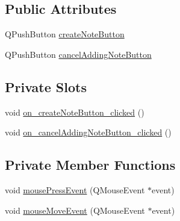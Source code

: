 \subsection*{Public Attributes}
\begin{DoxyCompactItemize}
\item 
Q\+Push\+Button \hyperlink{classaddNoteDialog_ae424f90e2d41fa5ec323d4c93a91f527}{create\+Note\+Button}
\item 
Q\+Push\+Button \hyperlink{classaddNoteDialog_a05ecc54eb7cba0d6ffbc5cabc8a4f551}{cancel\+Adding\+Note\+Button}
\end{DoxyCompactItemize}
\subsection*{Private Slots}
\begin{DoxyCompactItemize}
\item 
void \hyperlink{classaddNoteDialog_a67b28dc05851888a45774eb240d6e43d}{on\+\_\+create\+Note\+Button\+\_\+clicked} ()
\item 
void \hyperlink{classaddNoteDialog_af0e53e8f605b12087a3982e53409ca2f}{on\+\_\+cancel\+Adding\+Note\+Button\+\_\+clicked} ()
\end{DoxyCompactItemize}
\subsection*{Private Member Functions}
\begin{DoxyCompactItemize}
\item 
void \hyperlink{classaddNoteDialog_a5479e71fa86229b5d3a2e03ffd3ddbeb}{mouse\+Press\+Event} (Q\+Mouse\+Event $\ast$event)
\item 
void \hyperlink{classaddNoteDialog_a56670c6227c03bc1277f22789e7876e4}{mouse\+Move\+Event} (Q\+Mouse\+Event $\ast$event)
\end{DoxyCompactItemize}
